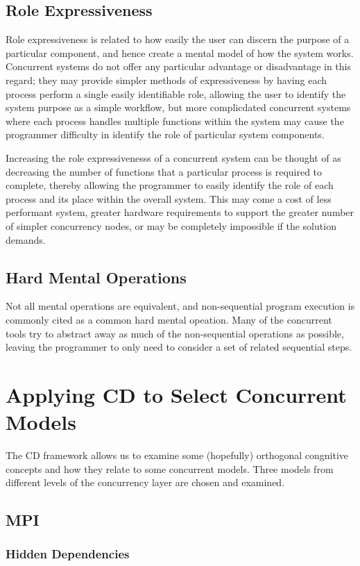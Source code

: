 \documentclass{sig-alternate}
\begin{document}
\subsection{Role Expressiveness}
Role expressiveness is related to how easily the user can discern the purpose of a particular component, and hence create a mental model of how the system works. Concurrent systems do not offer any particular advantage or disadvantage in this regard; they may provide simpler methods of expressiveness by having each process perform a single easily identifiable role, allowing the user to identify the system purpose as a simple workflow, but more complicdated concurrent systems where each process handles multiple functions within the system may cause the programmer difficulty in identify the role of particular system components. 

Increasing the role expressivenesss of a concurrent system can be thought of as decreasing the number of functions that a particular process is required to complete, thereby allowing the programmer to easily identify the role of each process and its place within the overall system. This may come a cost of less performant system, greater hardware requirements to support the greater number of simpler concurrency nodes, or may be completely impossible if the solution demands. 

\subsection{Hard Mental Operations}
Not all mental operations are equivalent, and non-sequential program execution is commonly cited as a common hard mental opeation. Many of the concurrent tools try to abstract away as much of the non-sequential operations as possible, leaving the programmer to only need to consider a set of related sequential steps. 

\section{Applying CD to Select Concurrent Models}
The CD framework allows us to examine some (hopefully) orthogonal congnitive concepts and how they relate to some concurrent models. Three models from different levels of the concurrency layer are chosen and examined.

\subsection{MPI}
\subsubsection{Hidden Dependencies}
\end{document}
